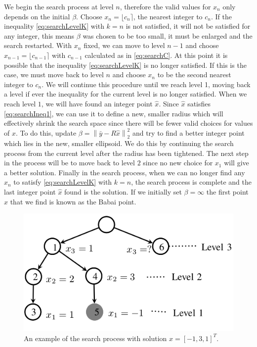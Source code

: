 \documentclass[12pt,Bold,letterpaper]{mcgilletdclass}
\begin{document}
We begin the search process
at level $n$, therefore the valid values for $x_n$ only depends on the initial $\beta$. Choose $x_n = \lfloor c_n \rceil$, the nearest integer to $c_n$. If the inequality \eqref{eq:searchLevelK} with $k=n$
is not satisfied, it will not be satisfied for any integer, this means $\beta$
was chosen to be too small, it must be enlarged and the search restarted. With $x_n$ fixed, we can move
to level $n-1$ and choose $x_{n-1} = \lfloor c_{n-1} \rceil$ with $c_{n-1}$ calculated as in \eqref{eq:searchC}. At this point it is possible that the inequality \eqref{eq:searchLevelK} is no longer satisfied. If this is the case, we must move back to level $n$ and choose $x_n$ to be the second nearest integer to $c_n$.  We will continue this procedure until we reach
level 1, moving back a level if ever the inequality for the current level is no longer satisfied. When we reach level $1$, we will have found an integer point $\hat{x}$. Since $\hat{x}$ satisfies \ref{eq:searchIneq1}, we can use it to define a new, smaller radius which will effectively shrink the search space since there will be fewer valid choices for values of $x$.  To do this, update $\beta = \left \| \bar{y} - R\hat{x} \right \|_2^2$ and try to find a better integer point which lies in the new, smaller ellipsoid. We do this by continuing the search process from the current level after the radius has been tightened. The next step in the process will be to move back to level $2$ since no new choice for $x_1$ will give a better solution. Finally in the search process, when we can no longer find any $x_n$ to satisfy \eqref{eq:searchLevelK} with $k=n$, the search process is complete and the last integer point $\hat{x}$ found is the solution. If we initially set $\beta = \infty$ the first point $\hat{x}$ that we find is known as the Babai point.

\begin{figure}
\centering
\includegraphics{searchtree.png}
\caption{An example of the search process with solution $x = [-1,3,1]^T$.}
\label{fig:treeSearch}
\end{figure}
\end{document}
